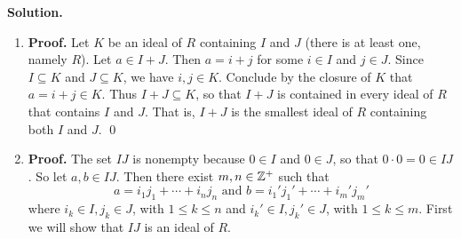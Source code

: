 \begin{enumerate}
      \textbf{Solution.}

      \begin{enumerate}
         \item \textbf{Proof.} Let $K$ be an ideal of $R$ containing $I$ and
               $J$ (there is at least one, namely $R$). Let $a \in I + J$. Then
               $a = i + j$ for some $i \in I$ and $j \in J$. Since
               $I \subseteq K$ and $J \subseteq K$, we have $i, j \in K$.
               Conclude by the closure of $K$ that $a = i + j \in K$. Thus
               $I + J \subseteq K$, so that $I + J$ is contained in every ideal
               of $R$ that contains $I$ and $J$. That is, $I + J$ is the 
               smallest ideal of $R$ containing both $I$ and $J$. \qed
         \item \textbf{Proof.} The set $IJ$ is nonempty because $0 \in I$ and
               $0 \in J$, so that $0 \cdot 0 = 0 \in IJ$. So let $a, b \in IJ$. 
               Then there exist $m, n \in \mathbb{Z}^+$ such that
               $$a = i_1j_1 + \cdots + i_nj_n \text{ and }
                 b = i_1'j_1' + \cdots + i_m'j_m'$$
               where $i_k \in I, j_k \in J$, with $1 \le k \le n$ and
               $i_k' \in I, j_k' \in J$, with $1 \le k \le m$. First we will
               show that $IJ$ is an ideal of $R$.


\end{enumerate}
\end{enumerate}

